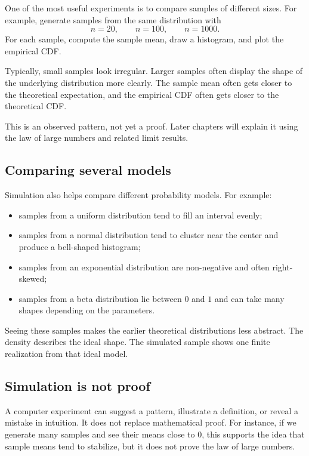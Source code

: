 One of the most useful experiments is to compare samples of different sizes. For
example, generate samples from the same distribution with
\[
n=20,\qquad n=100,\qquad n=1000.
\]
For each sample, compute the sample mean, draw a histogram, and plot the
empirical CDF.

Typically, small samples look irregular. Larger samples often display the shape
of the underlying distribution more clearly. The sample mean often gets closer to
the theoretical expectation, and the empirical CDF often gets closer to the
theoretical CDF.

This is an observed pattern, not yet a proof. Later chapters will explain it
using the law of large numbers and related limit results.

\subsection*{Comparing several models}

Simulation also helps compare different probability models. For example:
\begin{itemize}
    \item samples from a uniform distribution tend to fill an interval evenly;
    \item samples from a normal distribution tend to cluster near the center and
    produce a bell-shaped histogram;
    \item samples from an exponential distribution are non-negative and often
    right-skewed;
    \item samples from a beta distribution lie between \(0\) and \(1\) and can
    take many shapes depending on the parameters.
\end{itemize}

Seeing these samples makes the earlier theoretical distributions less abstract.
The density describes the ideal shape. The simulated sample shows one finite
realization from that ideal model.

\subsection*{Simulation is not proof}

A computer experiment can suggest a pattern, illustrate a definition, or reveal a
mistake in intuition. It does not replace mathematical proof. For instance, if
we generate many samples and see their means close to \(0\), this supports the
idea that sample means tend to stabilize, but it does not prove the law of large
numbers.

